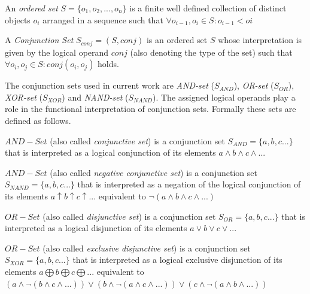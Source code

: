 \begin{definition}\label{def:set}
	An \textit{ordered set} $S=\{o_1,o_2,...,o_n\}$ is a finite well defined collection of distinct objects $o_{i}$ arranged in a sequence such that $\forall o_{i-1},o_{i} \in S: o_{i-1}<o{i}$
\end{definition}

\begin{definition}\label{def:conj-set}
	A \textit{Conjunction Set} $S_{conj}=(S,conj)$ is an ordered set $S$ whose interpretation is given by the logical operand $conj$ (also denoting the type of the set) such that $\forall o_{i},o_{j} \in S: conj(o_{i}, o_{j})$ holds.
\end{definition}

The conjunction sets used in current work are \textit{AND-set} ($S_{AND}$), \textit{OR-set} ($S_{OR}$), \textit{XOR-set} ($S_{XOR}$) and \textit{NAND-set} ($S_{NAND}$). The assigned logical operands play a role in the functional interpretation of conjunction sets.%
Formally these sets are defined as follows.

\begin{definition}\label{def:and-set}
	$AND-Set$ (also called \textit{conjunctive set}) is a conjunction set $S_{AND}=\{a,b,c...\}$ that is interpreted as a logical conjunction of its elements $a \wedge b \wedge c \wedge ...$ 
\end{definition}

\begin{definition}\label{def:nand-set}
	$AND-Set$ (also called \textit{negative conjunctive set}) is a conjunction set $S_{NAND}=\{a,b,c...\}$ that is interpreted as a negation of the logical conjunction of its elements $a \uparrow b \uparrow c \uparrow ...$ equivalent to $ \neg(a \wedge b \wedge c \wedge ...)$ 
\end{definition}

\begin{definition}[OR-Set]\label{def:or-set}
	$OR-Set$ (also called \textit{disjunctive set}) is a conjunction set $S_{OR}=\{a,b,c...\}$ that is interpreted as a logical disjunction of its elements $a \vee b \vee c \vee ...$
\end{definition}

\begin{definition}\label{def:xor-set}
	$OR-Set$ (also called \textit{exclusive disjunctive set}) is a conjunction set $S_{XOR}=\{a,b,c...\}$ that is interpreted as a logical exclusive disjunction of its elements $a \bigoplus b \bigoplus c \bigoplus ...$ equivalent to $ (a \wedge \neg (b \wedge c \wedge ... )) \vee (b \wedge \neg (a \wedge c \wedge ...)) \vee (c \wedge \neg (a \wedge b \wedge ...)) $
\end{definition}

